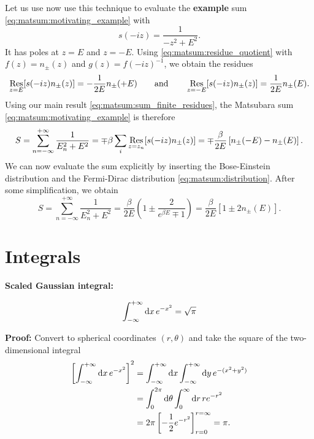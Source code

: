 Let us use now use this technique to evaluate the \textbf{example} sum \eqref{eq:matsum:motivating_example} with
\begin{equation}
	s(-iz) = \frac{1}{-z^2 + E^2} .
\end{equation}
It has poles at $z = E$ and $z = -E$.
Using \cref{eq:matsum:residue_quotient} with $f(z) = n_\pm(z)$ and $g(z) = f(-iz)^{-1}$, we obtain the residues
\begin{equation}
	\operatorname*{Res}_{z =  E}[s(-iz) n_\pm(z)] = -\frac{1}{2 E} n_\pm(+E) 
	\qquad \text{and} \qquad
	\operatorname*{Res}_{z = -E}[s(-iz) n_\pm(z)] =  \frac{1}{2 E} n_\pm( E) .
\end{equation}
Using our main result \eqref{eq:matsum:sum_finite_residues}, the Matsubara sum \eqref{eq:matsum:motivating_example} is therefore
\begin{equation}
	S = \sum_{n=-\infty}^{+\infty} \frac{1}{E_n^2 + E^2}
	  = \mp \beta \sum_i \operatorname*{Res}_{z=z_n}[s(-i z) n_\pm(z)]
	  = \mp \frac{\beta}{2 E} \left[ n_\pm(-E) - n_\pm(E) \right] .
\end{equation}
We can now evaluate the sum explicitly by inserting the Bose-Einstein distribution and the Fermi-Dirac distribution \eqref{eq:matsum:distribution}.
After some simplification, we obtain
\begin{equation}
	S = \sum_{n=-\infty}^{+\infty} \frac{1}{E_n^2 + E^2}
	  = \frac{\beta}{2 E} \left( 1 \pm \frac{2}{e^{\beta E} \mp 1} \right)
	  = \frac{\beta}{2 E} \left[ 1 \pm 2 n_\pm(E) \right] .
\label{eq:matsum:example_result}
\end{equation}

\chapter{Integrals}

\newcommand\formulawithcomment[4]{%
\textbf{#1:}
#2
\textbf{#3:} #4
}

\newcommand\formulawithproof[3]{\formulawithcomment{#1}{#2}{Proof}{#3}}
\newcommand\formulawithreference[3]{\formulawithcomment{#1}{#2}{Reference}{#3}}

\formulawithproof{Scaled Gaussian integral}{
	\begin{equation}
		\int_{-\infty}^{+\infty} \mathop{}\!\mathrm{d} x \, e^{-x^2} = \sqrt{\pi}
	\label{eq:integrals:gaussian_sqrtpi}
	\end{equation}
}{
	Convert to spherical coordinates $(r, \theta)$ and take the square of the two-dimensional integral
	\begin{equation*}
	\begin{split}
			\left[ \int_{-\infty}^{+\infty} \mathop{}\!\mathrm{d} x \, e^{-x^2} \right]^2 &= \int_{-\infty}^{+\infty} \mathop{}\!\mathrm{d} x \int_{-\infty}^{+\infty} \mathop{}\!\mathrm{d} y \, e^{-(x^2 + y^2)} \\
		                                                             &= \int_{0}^{2 \pi} \mathop{}\!\mathrm{d} \theta \int_{0}^{\infty} \mathop{}\!\mathrm{d} r \, r e^{-r^2} \\
																	 &= 2 \pi \left[ -\frac12 e^{-r^2} \right]_{r=0}^{r=\infty} = \pi . \\
	\end{split}
	\end{equation*}
}

